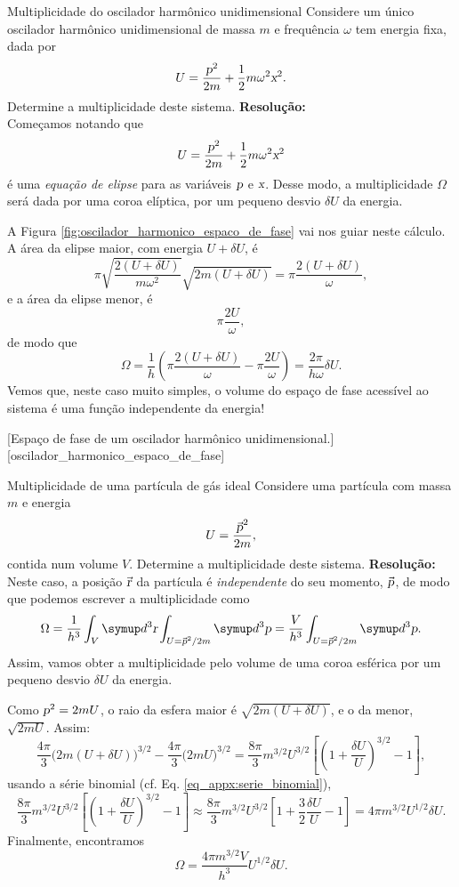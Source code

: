     \begin{example}{Multiplicidade do oscilador harmônico unidimensional}{}
        Considere um único oscilador harmônico unidimensional de massa $m$ e frequência $\omega$ tem energia fixa, dada por \[U=\frac{\p^2}{2m}+\frac{1}{2}m\omega^2\X^2.\] Determine a multiplicidade deste sistema.
        \tcblower
        \noindent\textbf{Resolução:}\\
        \indent Começamos notando que \[U=\frac{\p^2}{2m}+\frac{1}{2}m\omega^2\X^2\] é uma \textit{equação de elipse} para as variáveis $\p$ e $\X$. Desse modo, a multiplicidade $\Omega$ será dada por uma coroa elíptica, por um pequeno desvio $\delta U$ da energia. 
        
        A Figura \ref{fig:oscilador_harmonico_espaco_de_fase} vai nos guiar neste cálculo. A área da elipse maior, com energia $U+\delta U$, é \[\pi\sqrt{\frac{2(U+\delta U)}{m\omega^2}}
\sqrt{2m(U+\delta U)} = \pi\frac{2(U+\delta U)}{\omega},\] e a área da elipse menor, é \[\pi\frac{2U}{\omega},\] de modo que \[\Omega = \frac{1}{h}\left(\pi\frac{2(U+\delta U)}{\omega}-\pi\frac{2U}{\omega} \right)=\frac{2\pi}{h\omega}\delta U.\] Vemos que, neste caso muito simples, o volume do espaço de fase acessível ao sistema é uma função independente da energia!

        \tikzFig%
            {}%
            [Espaço de fase de um oscilador harmônico unidimensional.]%
            [oscilador_harmonico_espaco_de_fase]
    \end{example}

    \begin{solved}{Multiplicidade de uma partícula de gás ideal}{}
        Considere uma partícula com massa $m$ e energia \[U=\frac{\vec{\p}^2}{2m},\] contida num volume $V$. Determine a multiplicidade deste sistema.
        \tcblower
        \noindent\textbf{Resolução:}\\
        \indent Neste caso, a posição $\vec{\R}$ da partícula é \textit{independente} do seu momento, $\vec{\p}$, de modo que podemos escrever a multiplicidade como \[\Omega = \frac{1}{h^3}\int_V\diff^3\R\int_{U=\vec{\p}^2/2m}\diff^3\p=\frac{V}{h^3}\int_{U=\vec{\p}^2/2m}\diff^3\p.\]
        Assim, vamos obter a multiplicidade pelo volume de uma coroa esférica por um pequeno desvio $\delta U$ da energia.

        Como $\p^2=2mU$, o raio da esfera maior é $\sqrt{2m(U+\delta U)}$, e o da menor, $\sqrt{2mU}$. Assim: \[\frac{4\pi}{3}\big(2m(U+\delta U)\big)^{3/2}-\frac{4\pi}{3}\big(2mU\big)^{3/2}=\frac{8\pi}{3}m^{3/2}U^{3/2}\left[\left(1+\frac{\delta U}{U}\right)^{3/2}-1\right],\] usando a série binomial (cf. Eq. \eqref{eq_appx:serie_binomial}), \[\frac{8\pi}{3}m^{3/2}U^{3/2}\left[\left(1+\frac{\delta U}{U}\right)^{3/2}-1\right]\approx\frac{8\pi}{3}m^{3/2}U^{3/2}\left[1+\frac{3}{2}\frac{\delta U}{U}-1\right]=4\pi m^{3/2}U^{1/2}\delta U.\] Finalmente, encontramos \[\Omega = \frac{4\pi m^{3/2}V}{h^3}U^{1/2}\delta U.\]
    \end{solved}

